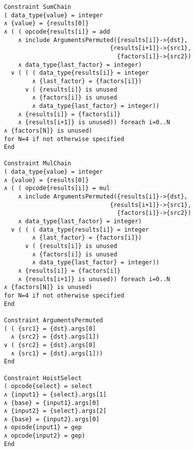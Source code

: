 \begin{figure}[p]
\begin{lstlisting}[language=IDL,basicstyle=\linespread{0.8}\small\ttfamily,
                   firstnumber=208]
Constraint SumChain
( data_type{value} = integer
∧ {value} = {results[0]}
∧ ( ( opcode{results[i]} = add
    ∧ include ArgumentsPermuted({results[i]}->{dst},
                              {results[i+1]}->{src1},
                                {factors[i]}->{src2})
    ∧ data_type{last_factor} = integer)
  ∨ ( ( ( data_type{results[i]} = integer
        ∧ {last_factor} = {factors[i]})
      ∨ ( {results[i]} is unused
        ∧ {factors[i]} is unused
        ∧ data_type{last_factor} = integer))
    ∧ {results[i]} = {factors[i]}
    ∧ {results[i+1]} is unused)) foreach i=0..N
∧ {factors[N]} is unused)
for N=4 if not otherwise specified
End

Constraint MulChain
( data_type{value} = integer
∧ {value} = {results[0]}
∧ ( ( opcode{results[i]} = mul
    ∧ include ArgumentsPermuted({results[i]}->{dst},
                              {results[i+1]}->{src1},
                                {factors[i]}->{src2})
    ∧ data_type{last_factor} = integer)
  ∨ ( ( ( data_type{results[i]} = integer
        ∧ {last_factor} = {factors[i]})
      ∨ ( {results[i]} is unused
        ∧ {factors[i]} is unused
        ∧ data_type{last_factor} = integer))
    ∧ {results[i]} = {factors[i]}
    ∧ {results[i+1]} is unused)) foreach i=0..N
∧ {factors[N]} is unused)
for N=4 if not otherwise specified
End

Constraint ArgumentsPermuted
( ( {src1} = {dst}.args[0]
  ∧ {src2} = {dst}.args[1])
∨ ( {src2} = {dst}.args[0]
  ∧ {src1} = {dst}.args[1]))
End

Constraint HoistSelect
( opcode{select} = select
∧ {input1} = {select}.args[1]
∧ {base} = {input1}.args[0]
∧ {input2} = {select}.args[2]
∧ {base} = {input2}.args[0]
∧ opcode{input1} = gep
∧ opcode{input2} = gep)
End
\end{lstlisting}
\end{figure}
